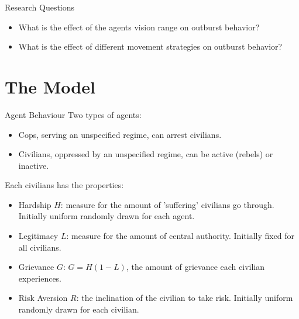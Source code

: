 \documentclass[red]{beamer}
\begin{document}
\begin{frame}{Research Questions}
  \begin{itemize}
  \item
    What is the effect of the agents vision range on outburst behavior?
  \item
    What is the effect of different movement strategies on outburst behavior?
  \end{itemize}
\end{frame}

\section{The Model}

\begin{frame}{Agent Behaviour}
  Two types of agents:
  \begin{itemize}
  \item
    Cops, serving an unspecified regime, can arrest civilians.
  \item
    Civilians, oppressed by an unspecified regime, can be active (rebels) or inactive.
  \end{itemize}

  Each civilians has the properties:
  \begin{itemize}
  \item
    Hardship $H$: measure for the amount of 'suffering' civilians go through. Initially uniform randomly drawn for each agent.
  \item
    Legitimacy $L$: measure for the amount of central authority. Initially fixed for all civilians.
  \item
    Grievance $G$: $G = H(1 - L)$, the amount of grievance each civilian experiences.
  \item
    Risk Aversion $R$: the inclination of the civilian to take risk. Initially uniform randomly drawn for each civilian.
  \end{itemize}

\end{frame}
\end{document}
